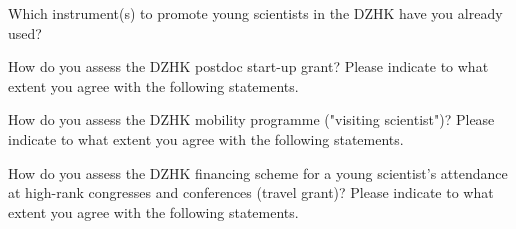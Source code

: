 \documentclass[
  english,
  globalid=09-2019-v4-Young-DZHK,
  pagemark,
  stamp]{sdaps}
\begin{document}
\begin{questionnaire}
\begin{choicequestion}[4]{Which instrument(s) to promote young scientists 
in the DZHK have you already used?}
    \end{choicequestion}
 
\begin{choicegroup}{How do you assess the DZHK postdoc start-up grant? 
Please indicate to what extent you agree with the
following statements.}


      
\vspace{0.2cm}

    \end{choicegroup}

 
    

    
\begin{choicegroup}{How do you assess the DZHK mobility programme ("visiting 
scientist")? Please indicate to what extent you agree
with the following statements.
}


      
\vspace{0.2cm}
    \end{choicegroup}
    
    
\begin{choicegroup}{How do you assess the DZHK financing scheme for a young 
scientist's attendance at high-rank congresses and
conferences (travel grant)? Please indicate to what extent you agree with the 
following statements.}



\end{choicegroup}
\end{questionnaire}
\end{document}
